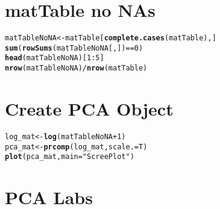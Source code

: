 \documentclass{article}\usepackage{graphicx, color}
\makeatletter
\newcommand{\hlfunctioncall}[1]{\textcolor[rgb]{0.501960784313725,0,0.329411764705882}{\textbf{#1}}}%
\newcommand{\hlstring}[1]{\textcolor[rgb]{0.6,0.6,1}{#1}}%
\newenvironment{kframe}{%
 \def\at@end@of@kframe{}%
 \ifinner\ifhmode%
  \def\at@end@of@kframe{\end{minipage}}%
  \begin{minipage}{\columnwidth}%
 \fi\fi%
 \def\FrameCommand##1{\hskip\@totalleftmargin \hskip-\fboxsep
 \colorbox{shadecolor}{##1}\hskip-\fboxsep
     \hskip-\linewidth \hskip-\@totalleftmargin \hskip\columnwidth}%
 \MakeFramed {\advance\hsize-\width
   \@totalleftmargin\z@ \linewidth\hsize
   \@setminipage}}%
 {\par\unskip\endMakeFramed%
 \at@end@of@kframe}
\newenvironment{knitrout}{}{} %
\makeatother
\begin{document}
\section{matTable no NAs}

\begin{knitrout}
\color{fgcolor}\begin{kframe}
\begin{alltt}
matTableNoNA <- matTable[\hlfunctioncall{complete.cases}(matTable), ]
\hlfunctioncall{sum}(\hlfunctioncall{rowSums}(matTableNoNA[, ]) == 0)
\hlfunctioncall{head}(matTableNoNA)[1:5]
\hlfunctioncall{nrow}(matTableNoNA)/\hlfunctioncall{nrow}(matTable)
\end{alltt}
\end{kframe}
\end{knitrout}


\section{Create PCA Object}

\begin{knitrout}
\color{fgcolor}\begin{kframe}
\begin{alltt}
log_mat <- \hlfunctioncall{log}(matTableNoNA + 1)
pca_mat <- \hlfunctioncall{prcomp}(log_mat, scale. = T)
\hlfunctioncall{plot}(pca_mat, main = \hlstring{"Scree Plot"})
\end{alltt}
\end{kframe}
\end{knitrout}


\section{PCA Labs}
\end{document}
